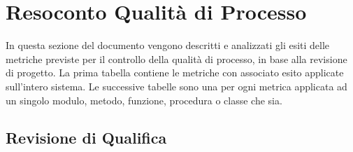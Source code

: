 \newpage
\section{Resoconto Qualità di Processo}

In questa sezione del documento vengono descritti e analizzati gli esiti delle metriche previste per il controllo della qualità di processo, in base alla revisione di progetto.
La prima tabella contiene le metriche con associato esito applicate sull'intero sistema.
Le successive tabelle sono una per ogni metrica applicata ad un singolo modulo, metodo, funzione, procedura o classe che sia.

	\subsection{Revisione di Qualifica}
	
